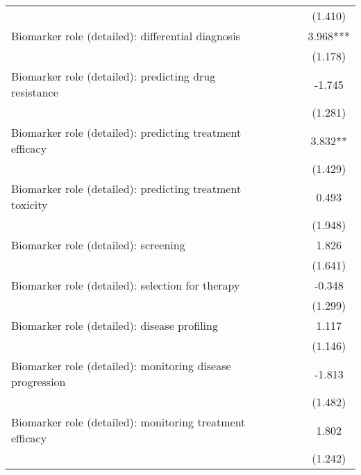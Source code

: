 \begin{table}[htb]
\begin{tabular}{l*{4}c}
                    &               &               &               &     (1.410)   \\
Biomarker role (detailed): differential diagnosis&               &               &               &       3.968***\\
                    &               &               &               &     (1.178)   \\
Biomarker role (detailed): predicting drug resistance&               &               &               &      -1.745   \\
                    &               &               &               &     (1.281)   \\
Biomarker role (detailed): predicting treatment efficacy&               &               &               &       3.832** \\
                    &               &               &               &     (1.429)   \\
Biomarker role (detailed): predicting treatment toxicity&               &               &               &       0.493   \\
                    &               &               &               &     (1.948)   \\
Biomarker role (detailed): screening&               &               &               &       1.826   \\
                    &               &               &               &     (1.641)   \\
Biomarker role (detailed): selection for therapy&               &               &               &      -0.348   \\
                    &               &               &               &     (1.299)   \\
Biomarker role (detailed): disease profiling&               &               &               &       1.117   \\
                    &               &               &               &     (1.146)   \\
Biomarker role (detailed): monitoring disease progression&               &               &               &      -1.813   \\
                    &               &               &               &     (1.482)   \\
Biomarker role (detailed): monitoring treatment efficacy&               &               &               &       1.802   \\
                    &               &               &               &     (1.242)   \\

\end{tabular}
\end{table}
